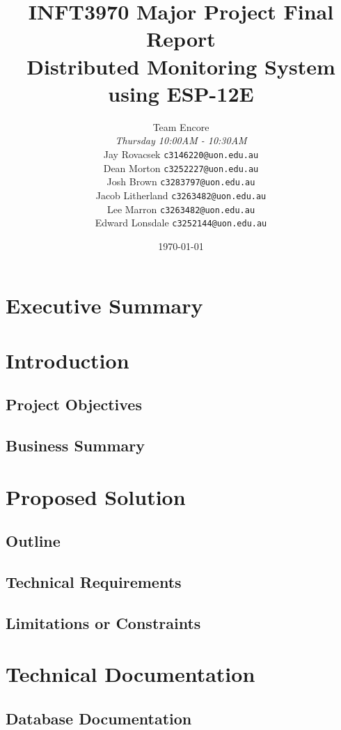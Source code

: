 \documentclass[
    a4paper,
    12pt,
    headings=normal
]{scrreprt}
\title{INFT3970 Major Project Final Report \protect\\
    Distributed Monitoring System using ESP-12E}
\author{
        Team Encore\\
        \textit{Thursday 10:00AM - 10:30AM}\\
        Jay Rovacsek
        \texttt{c3146220@uon.edu.au}\\
        Dean Morton
        \texttt{c3252227@uon.edu.au}\\
        Josh Brown
        \texttt{c3283797@uon.edu.au}\\
        Jacob Litherland
        \texttt{c3263482@uon.edu.au}\\
        Lee Marron
        \texttt{c3263482@uon.edu.au}\\
        Edward Lonsdale
        \texttt{c3252144@uon.edu.au}
    }
\date{\today}
\begin{document}
    \begin{titlingpage}
        \maketitle
    \end{titlingpage}

    \tableofcontents
    
    \newpage

    \section{Executive Summary}

    \newpage
    \section{Introduction}
        \subsection{Project Objectives}
        \subsection{Business Summary}

    \newpage
    \section{Proposed Solution}
        \subsection{Outline}
        \subsection{Technical Requirements}
        \subsection{Limitations or Constraints}

    \newpage
    \section{Technical Documentation}
        \subsection{Database Documentation}
\end{document}
